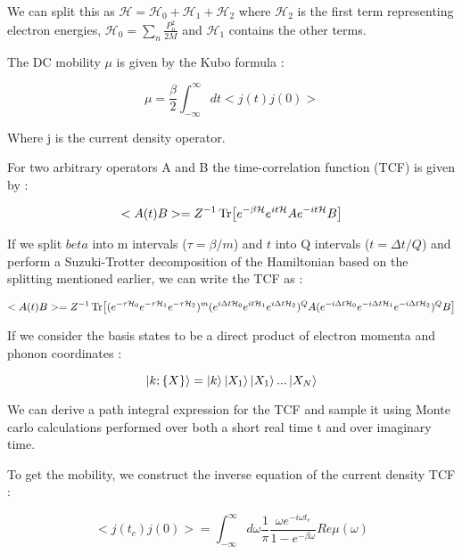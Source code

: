  We can split this as $\mathcal{H} = \mathcal{H}_0 + \mathcal{H}_1 + \mathcal{H}_2$ where $\mathcal{H}_2$ is the first term representing electron energies, $\mathcal{H}_0 = \sum_n \frac{P_n^2}{2M}$ and $\mathcal{H}_1$ contains the other terms.

 The DC mobility $\mu$ is given by the Kubo formula :

 \begin{equation}
    \mu = \frac{\beta}{2} \int_{-\infty}^{\infty} dt<j(t)j(0)>
 \end{equation}

Where j is the current density operator. 

For two arbitrary operators A and B the time-correlation function (TCF) is given by :

\begin{equation}
<A(t)B> = Z^{-1} \Tr[e^{-\beta \mathcal{H}} e^{it\mathcal{H}}Ae^{-it\mathcal{H}}B]
\end{equation}

If we split $beta$ into m intervals ($\tau = \beta/m$) and $t$ into Q intervals ($t= \Delta t/Q$) and perform a Suzuki-Trotter decomposition of the Hamiltonian based on the splitting mentioned earlier, we can write the TCF as :

\begin{equation}
<A(t)B> = Z^{-1} \Tr[(e^{-\tau \mathcal{H}_0}e^{-\tau \mathcal{H}_1}e^{-\tau \mathcal{H}_2})^m (e^{i\Delta t\mathcal{H}_0}e^{it\mathcal{H}_1}e^{i\Delta t\mathcal{H}_2})^QA(e^{-i \Delta t \mathcal{H}_0}e^{-i \Delta t \mathcal{H}_1}e^{-i \Delta t \mathcal{H}_2})^QB]
\end{equation}

If we consider the basis states to be a direct product of electron momenta and phonon coordinates :

\begin{equation}
    \ket{k;\{X\}} = \ket{k}\ket{X_1}\ket{X_1}...\ket{X_{N}}
\end{equation}

We can derive a path integral expression for the TCF and sample it using Monte carlo calculations performed over both a short real time t and over imaginary time.

To get the mobility, we construct the inverse equation of the current density TCF :

\begin{equation}
    <j(t_c)j(0)> = \int_{-\infty}^{\infty} d \omega \frac{1}{\pi} \frac{\omega e^{-i\omega t_c}}{1 - e^{-\beta \omega}} Re \mu(\omega)
\end{equation}

